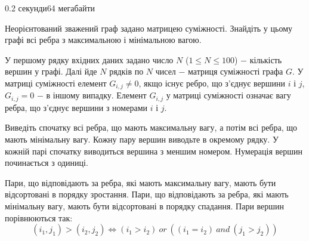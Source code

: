 \begin{problem}{}{}{}{0.2 секунди}{64 мегабайти}

Неорієнтований зважений граф задано матрицею суміжності. Знайдіть у цьому графі всі ребра з максимальною і мінімальною вагою.

\InputFile
У першому рядку вхідних даних задано число $N$ ($1 \le N \le 100$) $-$ кількість вершин у графі.
Далі йде $N$ рядків по $N$ чисел $-$ матриця суміжності графа $G$.
У матриці суміжності елемент $G_{i,j} \ne 0$, якщо існує ребро, що з'єднує вершини $i$ і $j$, $G_{i,j}=0$ $-$ в іншому випадку.
Елемент $G_{i,j}$ у матриці суміжності означає вагу ребра, що з'єднує вершини з номерами $i$ і $j$.

\OutputFile
Виведіть спочатку всі ребра, що мають максимальну вагу, а потім всі ребра, що мають мінімальну вагу.
Кожну пару вершин виводьте в окремому рядку. У кожній парі спочатку виводиться вершина з меншим номером.
Нумерація вершин починається з одиниці.

Пари, що відповідають за ребра, які мають максимальну вагу, мають бути відсортовані в порядку зростання.
Пари, що відповідають за ребра, які мають мінімальну вагу, мають бути відсортовані в порядку спадання.
Пари вершин порівнюються так: 
$$ (i_1, j_1) > (i_2, j_2) \Leftrightarrow (i_1 > i_2) \ or \ ((i_1=i_2) \ and \ (j_1>j_2))$$

\Example

\begin{example}
\end{example}

\end{problem}
